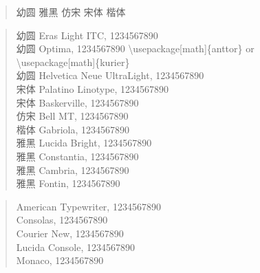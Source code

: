 \documentclass[12pt,a4paper]{article}
\begin{document}
\begin{Large}

\begin{verse}
{\YouYuan 幼圆}
{\YaHei 雅黑}
{\FangSong 仿宋}
{\SimSun 宋体}
{\KaiTi 楷体}
\end{verse}


\begin{verse}
{\YouYuan 幼圆} {\Eras Eras Light ITC, 1234567890}\\
{\YouYuan 幼圆} {\Optima Optima, 1234567890 \tiny{\Monaco \textbackslash{}usepackage[math]\{anttor\}
    or \textbackslash{}usepackage[math]\{kurier\}}}\\
{\YouYuan 幼圆} {\HelveticaNeueUL Helvetica Neue UltraLight, 1234567890}\\
{\SimSun 宋体} {\Palatino Palatino Linotype, 1234567890}\\
{\SimSun 宋体} {\Baskerville Baskerville, 1234567890}\\
{\FangSong 仿宋} {\BellMT Bell MT, 1234567890}\\
{\KaiTi 楷体} {\Gabriola Gabriola, 1234567890}\\
{\YaHei 雅黑} {\LucidaBright Lucida Bright, 1234567890}\\
{\YaHei 雅黑} {\Constantia Constantia, 1234567890}\\
{\YaHei 雅黑} {\Cambria Cambria, 1234567890}\\
{\YaHei 雅黑} {\Fontin Fontin, 1234567890}\\
\end{verse}

\begin{verse}
{\Typewriter American Typewriter, 1234567890}\\
{\Consolas Consolas, 1234567890}\\
{\CourierNew Courier New, 1234567890}\\
{\LucidaConsole Lucida Console, 1234567890}\\
{\Monaco Monaco, 1234567890}\\
\end{verse}

\end{Large}
\end{document}

